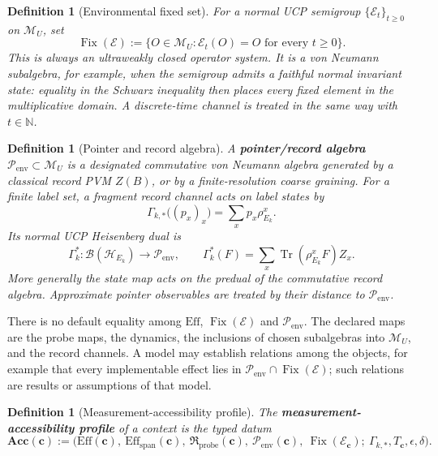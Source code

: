 \documentclass[12pt,a4paper]{article}
\newtheorem{definition}[theorem]{Definition}
\begin{document}
\begin{definition}[Environmental fixed set]
\label{def:fixed-set}
For a normal UCP semigroup $\{\mathcal E_t\}_{t\ge0}$ on $\mathcal M_U$, set
\[
\operatorname{Fix}(\mathcal E)
:=\{O\in\mathcal M_U:\mathcal E_t(O)=O\text{ for every }t\ge0\}.
\]
This is always an ultraweakly closed operator system. It is a von Neumann subalgebra, for example, when the semigroup admits a faithful normal invariant state: equality in the Schwarz inequality then places every fixed element in the multiplicative domain. A discrete-time channel is treated in the same way with $t\in\mathbb N$.
\end{definition}

\begin{definition}[Pointer and record algebra]
\label{def:pointer-algebra}
A \textbf{pointer/record algebra} $\mathcal P_{\mathrm{env}}\subset\mathcal M_U$
is a designated commutative von Neumann algebra generated by a
classical record PVM $Z(B)$, or by a finite-resolution coarse graining.
For a finite label set, a fragment record channel acts on label
states by
\[
 \Gamma_{k,*}\bigl((p_x)_x\bigr)=\sum_xp_x\rho_{E_k}^x .
\]
Its normal UCP Heisenberg dual is
\[
 \Gamma_k^*:\mathcal B(\mathcal H_{E_k})\longrightarrow
             \mathcal P_{\mathrm{env}},\qquad
 \Gamma_k^*(F)=\sum_x\operatorname{Tr}(\rho_{E_k}^x F)Z_x .
\]
More generally the state map acts on the predual of the commutative
record algebra. Approximate pointer observables are treated by their
distance to $\mathcal P_{\mathrm{env}}$.
\end{definition}

There is no default equality among $\mathrm{Eff}$, $\operatorname{Fix}(\mathcal E)$ and $\mathcal P_{\mathrm{env}}$. The declared maps are the probe maps, the dynamics, the inclusions of chosen subalgebras into $\mathcal M_U$, and the record channels. A model may establish relations among the objects, for example that every implementable effect lies in $\mathcal P_{\mathrm{env}}\cap\operatorname{Fix}(\mathcal E)$; such relations are results or assumptions of that model.

\begin{definition}[Measurement-accessibility profile]
\label{def:accessible-full}
The \textbf{measurement-accessibility profile} of a context is the typed datum
\begin{equation}
\mathbf{Acc}(\mathbf c)
:=\bigl(\mathrm{Eff}(\mathbf c),\ \mathrm{Eff}_{\mathrm{span}}(\mathbf c),\
\mathfrak R_{\mathrm{probe}}(\mathbf c),\
\mathcal P_{\mathrm{env}}(\mathbf c),\
\operatorname{Fix}(\mathcal E_{\mathbf c});\
\Gamma_{k,*},T_{\mathbf c},\epsilon,\delta\bigr).
\end{equation}
\end{definition}
\end{document}
